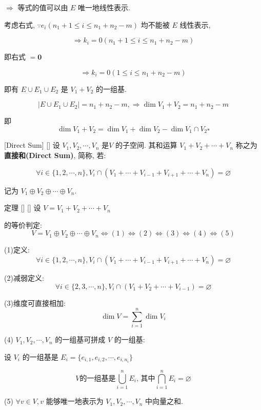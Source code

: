 \documentclass[UTF8]{ctexart}
\DeclareMathOperator{\0}{\mathbf{0}}
\DeclareMathOperator{\<}{\langle}
\renewcommand{\>}{\rangle}
\begin{document}
\begin{prf}
			 \(\Longrightarrow\) 等式的值可以由 \(E\) 唯一地线性表示. 
			
			考虑右式,  \(\because e_i(n_1+1\leq i\leq n_1+n_2-m)\) 均不能被 \(E\) 线性表示,
			
			\[\Longrightarrow k_i=0(n_1+1\leq i\leq n_1+n_2-m)\]
			
			即右式 \(=\mathbf{0}\) 
			
			\[\Longrightarrow k_i=0(1\leq i\leq n_1+n_2-m)\]
			
			即有 \(E\cup E_1\cup E_2\) 是 \(V_1+V_2\) 的一组基. 
			
			\[|E\cup E_1\cup E_2|=n_1+n_2-m, \Longrightarrow\dim V_1+V_2=n_1+n_2-m\]
			
			即\[\dim V_{1}+V_{2}=\dim V_{1}+\dim V_{2}-\dim V_{1}\cap V_{2}\square\]
		\end{prf}
  
		\begin{dfn}
			[Direct-Sum]
			{}
			[Direct Sum]
			[]
			设 \(V_1,V_2,\cdots,V_n\) 是 \(V\) 的子空间. 其和运算 \(V_1+V_2+\cdots+V_n\) 称之为\textbf{直接和(Direct Sum)}, 简称\textbf{}, 若: 
			
			\[\forall i\in\{1,2,\cdots,n\}, V_i\cap(V_1+\cdots+V_{i-1}+V_{i+1}+\cdots+V_n)=\varnothing\]
			
			记为 \(V_1\oplus V_2\oplus\cdots\oplus V_n\). 
		\end{dfn}
		
		\begin{thm}
			[]
			{ 定理}
			[]
			[]
			设 \(V=V_1+V_2+\cdots+V_n\) 
		
			 的等价判定: \[V=V_1\oplus V_2\oplus\cdots\oplus V_n\Longleftrightarrow(1)\Longleftrightarrow(2)\Longleftrightarrow(3)\Longleftrightarrow(4)\Longleftrightarrow(5)\]
			
			(1) 定义: \[\forall i\in\{1,2,\cdots,n\}, V_i\cap(V_1+\cdots+V_{i-1}+V_{i+1}+\cdots+V_n)=\varnothing\]
			
			(2)减弱定义: \[\forall i\in\{2,3,\cdots,n\}, V_i\cap(V_1+V_2+\cdots+V_{i-1})=\varnothing\]
			
			(3)维度可直接相加: \[\dim V=\sum_{i=1}^n\dim V_i\]
			
			(4) \(V_1,V_2,\cdots,V_n\) 的一组基可拼成 \(V\) 的一组基: 
			
			设 \(V_i\) 的一组基是 \(E_i=\{e_{i,1},e_{i,2},\cdots,e_{i,n_i}\}\) 
			
			\[V\mbox{的一组基是}\bigcup_{i=1}^nE_i\mbox{, 其中}\bigcap_{i=1}^nE_i=\varnothing\]
			
			(5) \(\forall v\in V, v\) 能够唯一地表示为 \(V_1,V_2,\cdots,V_n\) 中向量之和. 
		\end{thm}
\end{document}
